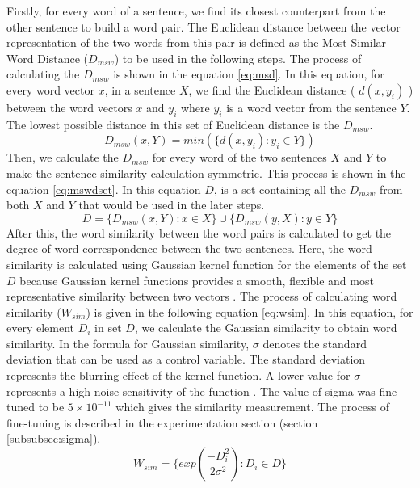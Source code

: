 Firstly, for every word of a sentence, we find its closest counterpart from the other sentence to build a word pair. The Euclidean distance between the vector representation of the two words from this pair is defined as the Most Similar Word Distance ($D_{msw}$) to be used in the following steps. The process of calculating the $D_{msw}$ is shown in the equation \ref{eq:msd}. In this equation, for every word vector $x$, in a sentence $X$, we find the Euclidean distance ( $d(x,y_i)$ ) between the word vectors $x$ and $y_i$ where $y_i$ is a word vector from the sentence $Y$. The lowest possible distance in this set of Euclidean distance is the $D_{msw}$. 
\begin{equation}\label{eq:msd}
    D_{msw}(x,Y) = min(\{d(x,y_i) : y_i \in Y \})
\end{equation}
Then, we calculate the $D_{msw}$ for every word of the two sentences $X$ and $Y$ to make the sentence similarity calculation symmetric. This process is shown in the equation \ref{eq:mswdset}. In this equation $D$, is a set containing all the $D_{msw}$ from both $X$ and $Y$ that would be used in the later steps.
\begin{equation}
    D = \{D_{msw}(x,Y) : x \in X\} \cup \{D_{msw}(y,X) : y \in Y\}
    \label{eq:mswdset}
\end{equation}
After this, the word similarity between the word pairs is calculated to get the degree of word correspondence between the two sentences. Here, the word similarity is calculated using Gaussian kernel function for the elements of the set $D$ because Gaussian kernel functions provides a smooth, flexible and most representative similarity between two vectors \cite{babud-1986-gaussian}. The process of calculating word similarity ($W_{sim}$) is given in the following equation \ref{eq:wsim}. In this equation, for every element $D_i$ in set $D$, we calculate the Gaussian similarity to obtain word similarity. In the formula for Gaussian similarity, $\sigma$ denotes the standard deviation that can be used as a control variable. The standard deviation represents the blurring effect of the kernel function. A lower value for $\sigma$ represents a high noise sensitivity of the function \cite{babud-1986-gaussian}. The value of sigma was fine-tuned to be $5\times10^{-11}$ which gives the similarity measurement. The process of fine-tuning is described in the experimentation section (section \ref{subsubsec:sigma}). 
\begin{equation}\label{eq:wsim}
    W_{sim} = \{ exp\left(\frac{-D_i^2}{2\sigma^2}\right) : D_i \in D\}
\end{equation}
